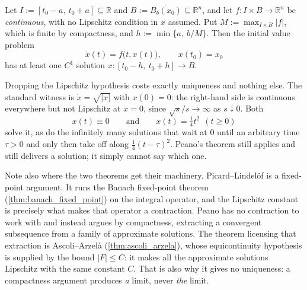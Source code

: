 \begin{theorem}
\label{thm:peano_existence_theorem}
Let $I := [t_0-a,\ t_0+a] \subseteq \mathbb{R}$ and $B := \overline{B_b(x_0)} \subseteq
\mathbb{R}^n$, and let $f : I \times B \to \mathbb{R}^n$ be \emph{continuous}, with no
Lipschitz condition in $x$ assumed. Put $M := \max_{I\times B}|f|$, which is finite by
compactness, and $h := \min\{a,\ b/M\}$. Then the initial value problem
\[\dot x(t) = f\big(t, x(t)\big), \qquad x(t_0) = x_0\]
has at least one $C^1$ solution $x : [t_0-h,\ t_0+h] \to B$.
\end{theorem}

\begin{remark}
\label{rem:peano_vs_picard}
Dropping the Lipschitz hypothesis costs exactly uniqueness and nothing else. The standard witness
is $\dot x = \sqrt{\lvert x\rvert}$ with $x(0) = 0$: the right-hand side is continuous everywhere
but not Lipschitz at $x = 0$, since $\sqrt{s}/s \to \infty$ as $s \downarrow 0$. Both
\[x(t) \equiv 0 \qquad\text{and}\qquad x(t) = \tfrac14t^2 \ \ (t \geq 0)\]
solve it, as do the infinitely many solutions that wait at $0$ until an arbitrary time $\tau > 0$
and only then take off along $\tfrac14(t-\tau)^2$. Peano's theorem still applies and still
delivers a solution; it simply cannot say which one.

Note also where the two theorems get their machinery. Picard--Lindelöf is a fixed-point
argument. It runs the Banach fixed-point theorem (\cref{thm:banach_fixed_point}) on the integral
operator, and the Lipschitz constant is precisely what makes that operator a contraction. Peano
has no contraction to work with and instead argues by compactness, extracting a convergent
subsequence from a family of approximate solutions. The theorem licensing that extraction
is Ascoli--Arzelà (\cref{thm:ascoli_arzela}), whose equicontinuity hypothesis is supplied by the
bound $\lvert F\rvert \leq C$: it makes all the approximate solutions Lipschitz with the same
constant $C$. That is also why it gives no uniqueness: a compactness argument produces \emph{a}
limit, never \emph{the} limit.
\end{remark}


